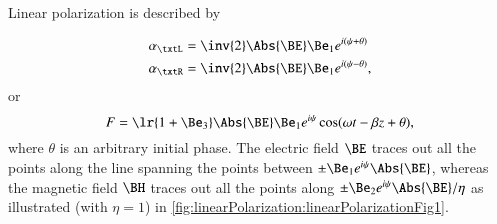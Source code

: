%
%

Linear polarization is described by

\begin{dmath}\label{eqn:polarization_linearPolarization:280}
\begin{aligned}
\alpha_\txtL &= \inv{2}\Abs{\BE} \Be_1 e^{i(\psi + \theta)} \\
\alpha_\txtR &= \inv{2}\Abs{\BE} \Be_1 e^{i(\psi - \theta)},
\end{aligned}
\end{dmath}
or
\begin{dmath}\label{eqn:polarization_linearPolarization:300}
F = \lr{ 1 + \Be_3 } \Abs{\BE} \Be_1 e^{i\psi} \cos( \omega t - \beta z + \theta ),
\end{dmath}
where \( \theta \) is an arbitrary initial phase.  The electric field \( \BE \) traces out all the points along the line spanning the points between \( \pm \Be_1 e^{i\psi} \Abs{\BE} \), whereas the magnetic field \( \BH \) traces
out all the points along \( \pm \Be_2 e^{i\psi} \Abs{\BE}/\eta \) as illustrated (with \( \eta = 1 \)) in
\cref{fig:linearPolarization:linearPolarizationFig1}.

